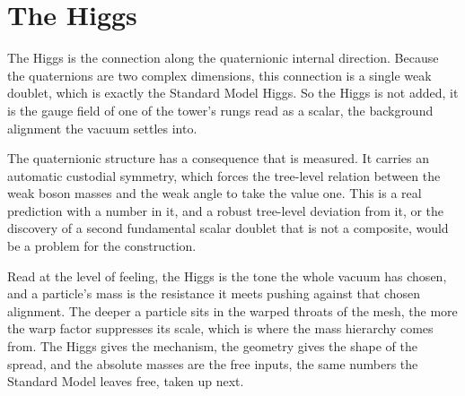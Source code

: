 \section{The Higgs}

The Higgs is the connection along the quaternionic internal direction. Because the quaternions are two complex
dimensions, this connection is a single weak doublet, which is exactly the Standard Model Higgs. So the Higgs is not
added, it is the gauge field of one of the tower's rungs read as a scalar, the background alignment the vacuum settles
into.

The quaternionic structure has a consequence that is measured. It carries an automatic custodial symmetry, which forces
the tree-level relation between the weak boson masses and the weak angle to take the value one. This is a real prediction
with a number in it, and a robust tree-level deviation from it, or the discovery of a second fundamental scalar doublet
that is not a composite, would be a problem for the construction.

Read at the level of feeling, the Higgs is the tone the whole vacuum has chosen, and a particle's mass is the resistance
it meets pushing against that chosen alignment. The deeper a particle sits in the warped throats of the mesh, the more
the warp factor suppresses its scale, which is where the mass hierarchy comes from. The Higgs gives the mechanism, the
geometry gives the shape of the spread, and the absolute masses are the free inputs, the same numbers the Standard Model
leaves free, taken up next.
